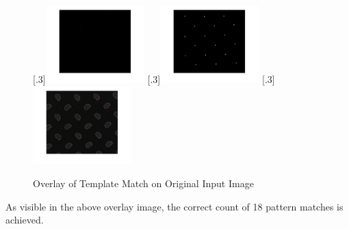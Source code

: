 \documentclass[a4paper]{article}
\begin{document}
	\begin{figure}[H]
		\centering
		[.3\linewidth]{\includegraphics[height=3cm]{Results/Q3/b/qbCentroid.jpg}}%
		[.3\linewidth]{\includegraphics[height=3cm]{Results/Q3/b/qbP2S.jpg}}%
		[.3\linewidth]{\includegraphics[height=3cm]{Results/Q3/b/qbOverlay.jpg}}%
		\caption{Overlay of Template Match on Original Input Image}
		\label{fig:}
	\end{figure}
	\par As visible in the above overlay image, the correct count of 18
	pattern matches is achieved.
\end{document}
